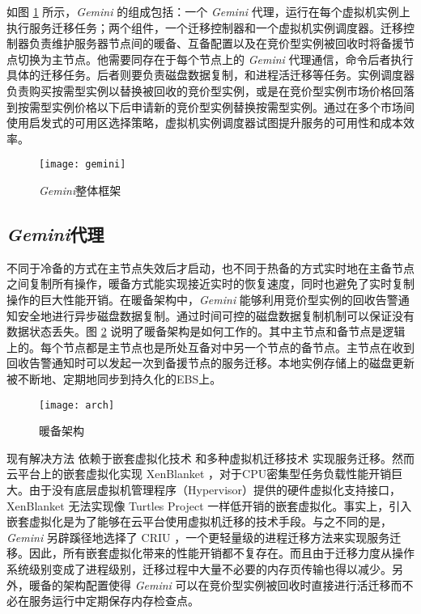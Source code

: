 如图 \ref{figure:gemini} 所示，\emph{Gemini} 的组成包括：一个 \emph{Gemini} 代理，运行在每个虚拟机实例上执行服务迁移任务；两个组件，一个迁移控制器和一个虚拟机实例调度器。迁移控制器负责维护服务器节点间的暖备、互备配置以及在竞价型实例被回收时将备援节点切换为主节点。他需要同存在于每个节点上的 \emph{Gemini} 代理通信，命令后者执行具体的迁移任务。后者则要负责磁盘数据复制，和进程活迁移等任务。实例调度器负责购买按需型实例以替换被回收的竞价型实例，或是在竞价型实例市场价格回落到按需型实例价格以下后申请新的竞价型实例替换按需型实例。通过在多个市场间使用启发式的可用区选择策略，虚拟机实例调度器试图提升服务的可用性和成本效率。
\begin{figure}
  \centering
  \texttt{[image: gemini]}
  \caption{\emph{Gemini}整体框架}
  \label{figure:gemini}
\end{figure}

\subsection{\emph{Gemini}代理}
不同于冷备的方式在主节点失效后才启动，也不同于热备的方式实时地在主备节点之间复制所有操作，暖备方式能实现接近实时的恢复速度，同时也避免了实时复制操作的巨大性能开销。在暖备架构中，\emph{Gemini} 能够利用竞价型实例的回收告警通知安全地进行异步磁盘数据复制。通过时间可控的磁盘数据复制机制可以保证没有数据状态丢失。图 \ref{figure:arch} 说明了暖备架构是如何工作的。其中主节点和备节点是逻辑上的。每个节点都是主节点也是所处互备对中另一个节点的备节点。主节点在收到回收告警通知时可以发起一次到备援节点的服务迁移。本地实例存储上的磁盘更新被不断地、定期地同步到持久化的EBS上。
\begin{figure}
  \centering
  \texttt{[image: arch]}
  \caption{暖备架构}
  \label{figure:arch}
\end{figure}

现有解决方法 \cite{He:2015:CCH:2749246.2749275} 依赖于嵌套虚拟化技术 \cite{Williams:2012:XVO:2168836.2168849} 和多种虚拟机迁移技术 \cite{Singh:2013:YEG:2482626.2482642, Hines:2009:PBL:1508293.1508301} 实现服务迁移。然而云平台上的嵌套虚拟化实现 XenBlanket \cite{Williams:2012:XVO:2168836.2168849}，对于CPU密集型任务负载性能开销巨大。由于没有底层虚拟机管理程序（Hypervisor）提供的硬件虚拟化支持接口，XenBlanket 无法实现像 Turtles Project \cite{Ben-Yehuda:2010:TPD:1924943.1924973} 一样低开销的嵌套虚拟化。事实上，引入嵌套虚拟化是为了能够在云平台使用虚拟机迁移的技术手段。与之不同的是，\emph{Gemini} 另辟蹊径地选择了 CRIU \cite{CRIU:2016}，一个更轻量级的进程迁移方法来实现服务迁移。因此，所有嵌套虚拟化带来的性能开销都不复存在。而且由于迁移力度从操作系统级别变成了进程级别，迁移过程中大量不必要的内存页传输也得以减少。另外，暖备的架构配置使得 \emph{Gemini} 可以在竞价型实例被回收时直接进行活迁移而不必在服务运行中定期保存内存检查点。

